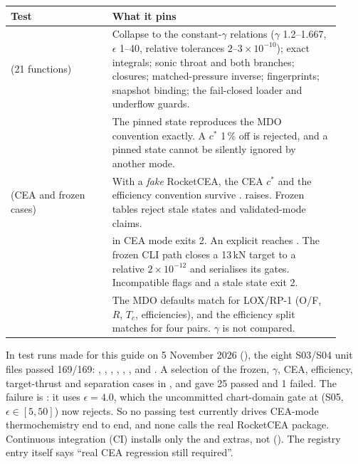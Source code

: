 {\small
\begin{longtable}{@{}P{0.29\linewidth}P{0.63\linewidth}@{}}
\toprule
Test & What it pins \\
\midrule
\endhead
{} (21 functions) & Collapse to the constant-$\gamma$ relations ($\gamma$ 1.2--1.667, $\epsilon$ 1--40, relative tolerances $2$--$3\times10^{-10}$); exact integrals; sonic throat and both branches; closures; matched-pressure inverse; fingerprints; snapshot binding; the fail-closed loader and underflow guards. \\
 & The pinned state reproduces the MDO convention exactly. A $c^*$ 1\,\% off is rejected, and a pinned state cannot be silently ignored by another mode. \\
 (CEA and frozen cases) & With a \emph{fake} RocketCEA, the CEA $c^*$ and the efficiency convention survive .  raises. Frozen tables reject stale states and validated-mode claims. \\
 &  in CEA mode exits 2. An explicit  reaches . The frozen CLI path closes a 13\,kN target to a relative $2\times10^{-12}$ and serialises its gates. Incompatible flags and a stale state exit 2. \\
 & The MDO defaults match  for LOX/RP-1 (O/F, $R$, $T_c$, efficiencies), and the efficiency split matches for four pairs. $\gamma$ is not compared. \\
\bottomrule
\end{longtable}
}

In test runs made for this guide on 5 November 2026 (), the eight S03/S04 unit files passed 169/169: , , , , , ,  and . A  selection of the frozen, $\gamma$, CEA, efficiency, target-thrust and separation cases in ,  and  gave 25 passed and 1 failed. The failure is : it uses $\epsilon=4.0$, which the uncommitted chart-domain gate at  (S05, $\epsilon\in[5,50]$) now rejects. So no passing test currently drives CEA-mode thermochemistry end to end, and none calls the real RocketCEA package. Continuous integration (CI) installs only the  and  extras, not  (). The registry entry  itself says ``real CEA regression still required''.

